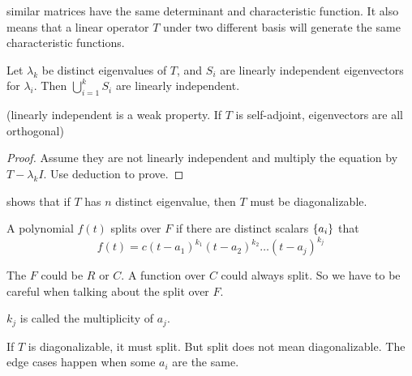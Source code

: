 \begin{theorem}
    similar matrices have the same determinant and characteristic function. It also means that a linear operator $T$ under two different basis will generate the same characteristic functions.
\end{theorem}


\begin{theorem}\label{eigenvector_sets_are_linearly_independent}
    Let $\lambda_k$ be distinct eigenvalues of $T$, and $S_i$ are linearly independent eigenvectors for $\lambda_i$. Then $\bigcup_{i=1}^k S_i$ are linearly independent.
    
    (linearly independent is a weak property. If $T$ is self-adjoint, eigenvectors are all orthogonal)
\end{theorem}
\begin{proof}
    Assume they are not linearly independent and multiply the equation by $T - \lambda_k I$. Use deduction to prove.
\end{proof}

 shows that if $T$ has $n$ distinct eigenvalue, then $T$ must be diagonalizable.

\begin{definition}
    A polynomial $f(t)$ splits over $F$ if there are distinct scalars $\set{a_i}$ that
    \begin{equation}
        f(t) = c (t - a_1)^{k_1} (t - a_2)^{k_2} \hdots (t - a_j)^{k_j}
    \end{equation}
    
    The $F$ could be $R$ or $C$. A function over $C$ could always split. So we have to be careful when talking about the split over $F$.
    
    $k_j$ is called the multiplicity of $a_j$.
\end{definition}

If $T$ is diagonalizable, it must split. But split does not mean diagonalizable. The edge cases happen when some $a_i$ are the same.



